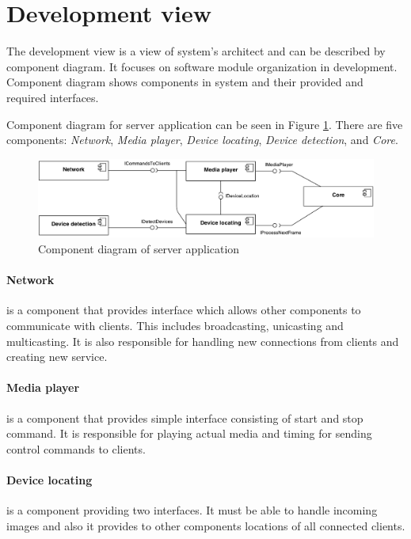 \section{Development view}
The development view is a view of system's architect and can be described by component diagram.
It focuses on software module organization in development.
Component diagram shows components in system and their provided and required interfaces.

Component diagram for server application can be seen in Figure \ref{fig:component_diagram_server}.
There are five components: \emph{Network}, \emph{Media player},  \emph{Device locating}, \emph{Device detection}, and \emph{Core}.

\begin{figure}[h]
	\centering
		\includegraphics[width=16.2cm]{softwareArchitecture/component_diagram.pdf}
	\caption{Component diagram of server application}
	\label{fig:component_diagram_server}
\end{figure}

\paragraph{Network} is a component that provides interface which allows other components to communicate with clients. 
This includes broadcasting, unicasting and multicasting. 
It is also responsible for handling new connections from clients and creating new service.

\paragraph{Media player} is a component that provides simple interface consisting of start and stop command. 
It is responsible for playing actual media and timing for sending control commands to clients.

\paragraph{Device locating} is a component providing two interfaces. 
It must be able to handle incoming images and also it provides to other components locations of all connected clients.

